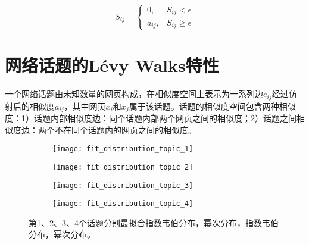 \begin{equation}\label{eq:filtergraph}
S_{ij} = 
\begin{cases}
0, & S_{ij} < \epsilon \\
a_{ij}, & S_{ij} \geq \epsilon
\end{cases}
\end{equation}


\section{网络话题的L\'{e}vy Walks特性}
一个网络话题由未知数量的网页构成，在相似度空间上表示为一系列边$e_{ij}$经过仿射后的相似度$a_{ij}$，其中网页$x_i$和$x_j$属于该话题。话题的相似度空间包含两种相似度：1）话题内部相似度边：同个话题内部两个网页之间的相似度；2）话题之间相似度边：两个不在同个话题内的网页之间的相似度。

\begin{figure}[!htbp]
    \centering
    \begin{subfigure}[b]{0.24\textwidth}
      \texttt{[image: fit\_distribution\_topic\_1]}
      \caption{}
      \label{fig:fitdistribution_t1}
    \end{subfigure}%
    \begin{subfigure}[b]{0.24\textwidth}
      \texttt{[image: fit\_distribution\_topic\_2]}
      \caption{}
      \label{fig:fitdistribution_t2}
    \end{subfigure}
    \begin{subfigure}[b]{0.24\textwidth}
      \texttt{[image: fit\_distribution\_topic\_3]}
      \caption{}
      \label{fig:fitdistribution_t3}
    \end{subfigure}%
    \begin{subfigure}[b]{0.24\textwidth}
      \texttt{[image: fit\_distribution\_topic\_4]}
      \caption{}
      \label{fig:fitdistribution_t4}
    \end{subfigure}
    \caption{第1、2、3、4个话题分别最拟合指数韦伯分布，幂次分布，指数韦伯分布，幂次分布。}
    \label{fig:fitdistribution}
\end{figure}

